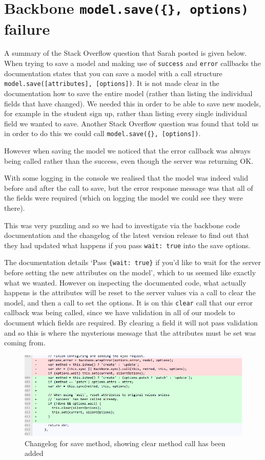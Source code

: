 \section{Backbone \texttt{model.save(\{\}, options)} failure}
A summary of the Stack Overflow question\cite{so_model_save} that Sarah posted is given below.
When trying to save a model and making use of \verb!success! and \verb!error! callbacks the documentation states that you can save a model with a call structure \verb!model.save([attributes], [options])!. 
It is not made clear in the documentation how to save the entire model (rather than listing the individual fields that have changed). We needed this in order to be able to save new models, for example in the student sign up, rather than listing every single individual field we wanted to save.
Another Stack Overflow question\cite{so_save_all_fields} was found that told us in order to do this we could call \verb!model.save({}, [options])!.

However when saving the model we noticed that the error callback was always being called rather than the success, even though the server was returning OK.

With some logging in the console we realised that the model was indeed valid before and after the call to save, but the error response message was that all of the fields were required (which on logging the model we could see they were there).

This was very puzzling and so we had to investigate via the backbone code documentation\cite{backbone_code} and the changelog of the latest version release\cite{backbone_change_log} to find out that they had updated what happens if you pass \verb!wait: true! into the save options.

The documentation details `Pass \verb!{wait: true}! if you'd like to wait for the server before setting the new attributes on the model', which to us seemed like exactly what we wanted. 
However on inspecting the documented code, what actually happens is the attributes will be reset to the server values via a call to clear the model, and then a call to set the options.
It is on this \verb!clear! call that our error callback was being called, since we have validation in all of our models
to document which fields are required. By clearing a field it will not pass validation and so this is where the mysterious message that the attributes must be set was coming from.

\begin{figure}[H]\centering
\includegraphics[scale=0.5]{images/appendix/backbone_changelog}
\caption{Changelog for save method, showing clear method call has been added}
\end{figure}


